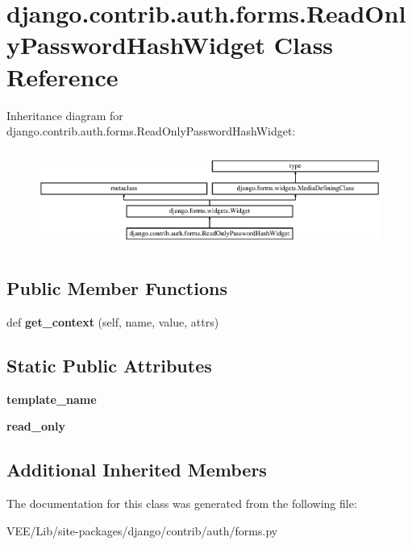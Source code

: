 \hypertarget{classdjango_1_1contrib_1_1auth_1_1forms_1_1_read_only_password_hash_widget}{}\section{django.\+contrib.\+auth.\+forms.\+Read\+Only\+Password\+Hash\+Widget Class Reference}
\label{classdjango_1_1contrib_1_1auth_1_1forms_1_1_read_only_password_hash_widget}
Inheritance diagram for django.\+contrib.\+auth.\+forms.\+Read\+Only\+Password\+Hash\+Widget\+:\begin{figure}[H]
\begin{center}
\leavevmode
\includegraphics[height=3.236994cm]{classdjango_1_1contrib_1_1auth_1_1forms_1_1_read_only_password_hash_widget}
\end{center}
\end{figure}
\subsection*{Public Member Functions}
\begin{DoxyCompactItemize}
\item 
\mbox{\label{classdjango_1_1contrib_1_1auth_1_1forms_1_1_read_only_password_hash_widget_aaa86f867ac5a112b680e9ace8aadd259}} 
def {\bfseries get\+\_\+context} (self, name, value, attrs)
\end{DoxyCompactItemize}
\subsection*{Static Public Attributes}
\begin{DoxyCompactItemize}
\item 
\mbox{\label{classdjango_1_1contrib_1_1auth_1_1forms_1_1_read_only_password_hash_widget_a447c29ee5b4bfe2ed1606681d8bd5df5}} 
{\bfseries template\+\_\+name}
\item 
\mbox{\label{classdjango_1_1contrib_1_1auth_1_1forms_1_1_read_only_password_hash_widget_a170b169d9e92d30e08bf0eaf20bbd311}} 
{\bfseries read\+\_\+only}
\end{DoxyCompactItemize}
\subsection*{Additional Inherited Members}


The documentation for this class was generated from the following file\+:\begin{DoxyCompactItemize}
\item 
V\+E\+E/\+Lib/site-\/packages/django/contrib/auth/forms.\+py\end{DoxyCompactItemize}

